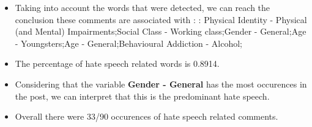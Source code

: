\documentclass[11pt]{article}
\begin{document}
\begin{itemize}\item Taking into account the words that were detected, we can reach the conclusion these comments are associated with : : Physical Identity - Physical (and Mental) Impairments;Social Class - Working class;Gender - General;Age - Youngsters;Age - General;Behavioural Addiction - Alcohol;%

\item The percentage of hate speech related words is 0.8914.

\item Considering that the variable \textbf{Gender - General} has the most occurences in the post, we can interpret that this is the predominant hate speech.

\item Overall there were 33/90 occurences of hate speech related comments.\end{itemize}
\end{document}
